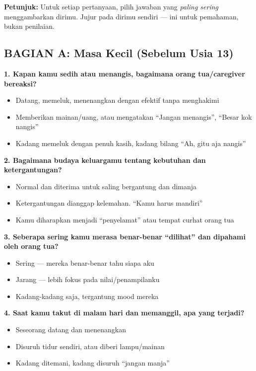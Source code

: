 \begin{exercisebox}
\textbf{Petunjuk:} Untuk setiap pertanyaan, pilih jawaban yang \textit{paling sering} menggambarkan dirimu. Jujur pada dirimu sendiri --- ini untuk pemahaman, bukan penilaian.

\subsection*{BAGIAN A: Masa Kecil (Sebelum Usia 13)}

\textbf{1. Kapan kamu sedih atau menangis, bagaimana orang tua/caregiver bereaksi?}
\begin{itemize}
    \item[A] Datang, memeluk, menenangkan dengan efektif tanpa menghakimi
    \item[B] Memberikan mainan/uang, atau mengatakan ``Jangan menangis'', ``Besar kok nangis''
    \item[C] Kadang memeluk dengan penuh kasih, kadang bilang ``Ah, gitu aja nangis''
\end{itemize}

\textbf{2. Bagaimana budaya keluargamu tentang kebutuhan dan ketergantungan?}
\begin{itemize}
    \item[A] Normal dan diterima untuk saling bergantung dan dimanja
    \item[B] Ketergantungan dianggap kelemahan. ``Kamu harus mandiri''
    \item[C] Kamu diharapkan menjadi ``penyelamat'' atau tempat curhat orang tua
\end{itemize}

\textbf{3. Seberapa sering kamu merasa benar-benar ``dilihat'' dan dipahami oleh orang tua?}
\begin{itemize}
    \item[A] Sering --- mereka benar-benar tahu siapa aku
    \item[B] Jarang --- lebih fokus pada nilai/penampilanku
    \item[C] Kadang-kadang saja, tergantung mood mereka
\end{itemize}

\textbf{4. Saat kamu takut di malam hari dan memanggil, apa yang terjadi?}
\begin{itemize}
    \item[A] Seseorang datang dan menenangkan
    \item[B] Disuruh tidur sendiri, atau diberi lampu/mainan
    \item[C] Kadang ditemani, kadang disuruh ``jangan manja''
\end{itemize}


\end{exercisebox}
